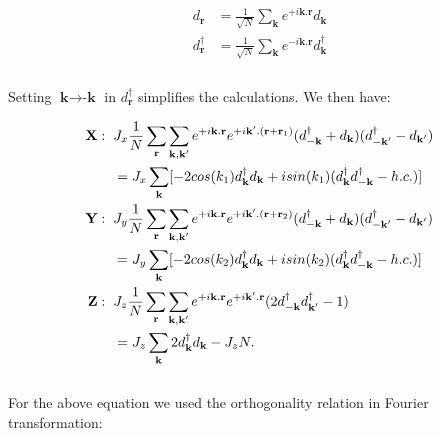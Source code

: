 \documentclass{article}
\begin{document}
\begin{equation}\label{eq:13}
	\begin{aligned}
		d_{\textbf{r}} &= \frac{1}{\sqrt{N}}\sum_\textbf{k} e^{+i\textbf{k}.\textbf{r}}d_{\textbf{k}} \\
		d^\dagger_{\textbf{r}} &= \frac{1}{\sqrt{N}}\sum_\textbf{k} e^{-i\textbf{k}.\textbf{r}}d^\dagger_{\textbf{k}} \\
	\end{aligned}
\end{equation}\\

\noindent Setting $\textbf{k} \rightarrow \textbf{-k}$ in $d^\dagger_\textbf{r}$ simplifies the calculations. We then have:

\begin{equation}\label{eq:14}
	\begin{aligned}
		\textbf{X}: \hspace{2mm} &J_x\frac{1}{N}\sum_\textbf{r}\sum_{\textbf{k},\textbf{k}'}e^{+i\textbf{k}.\textbf{r}}e^{+i\textbf{k}'.(\textbf{r}+\textbf{r}_1)}(d^\dagger_{-\textbf{k}} + d_{\textbf{k}})(d^\dagger_{-\textbf{k}'} - d_{\textbf{k}'})\\
		&= J_x\sum_{\textbf{k}} [-2cos(k_1)d^\dagger_{\textbf{k}}d_{\textbf{k}} + isin(k_1)(d^\dagger_{\textbf{k}}d^\dagger_{-\textbf{k}}-h.c.)]\\
		\textbf{Y}: \hspace{2mm} &J_y\frac{1}{N}\sum_\textbf{r}\sum_{\textbf{k},\textbf{k}'}e^{+i\textbf{k}.\textbf{r}}e^{+i\textbf{k}'.(\textbf{r}+\textbf{r}_2)}(d^\dagger_{-\textbf{k}} + d_{\textbf{k}})(d^\dagger_{-\textbf{k}'} - d_{\textbf{k}'})\\
		&= J_y\sum_{\textbf{k}} [-2cos(k_2)d^\dagger_{\textbf{k}}d_{\textbf{k}} + isin(k_2)(d^\dagger_{\textbf{k}}d^\dagger_{-\textbf{k}}-h.c.)]\\
		\textbf{Z}: \hspace{2mm} &J_z\frac{1}{N}\sum_\textbf{r}\sum_{\textbf{k},\textbf{k}'}e^{+i\textbf{k}.\textbf{r}}e^{+i\textbf{k}'.\textbf{r}}(2d^\dagger_{-\textbf{k}}d^\dagger_{\textbf{k}'}-1)\\
		&= J_z\sum_{\textbf{k}} 2d^\dagger_{\textbf{k}}d_{\textbf{k}}-J_zN.\\
	\end{aligned}
\end{equation}\\

\noindent For the above equation we used the orthogonality relation in Fourier transformation:
\end{document}
